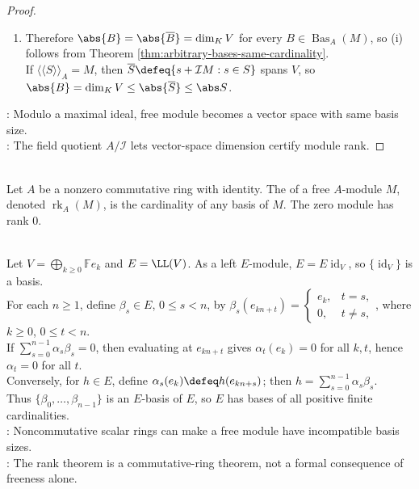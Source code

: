 \begin{theorem}
\begin{proof}
\begin{enumerate}[label=(\roman*)]
If $\overline b=\overline{b'}$ with $b\neq b'$, then $b-b'\in\mathcal{I}M$, forcing the $B$-coefficient $1\in\mathcal{I}$, impossible. Thus $B\xrightarrow{\sim}\overline B$.
\item Therefore $\abs{B}=\abs{\overline B}=\dim_K V$ for every $B\in\operatorname{Bas}_A(M)$, so (i) follows from Theorem \ref{thm:arbitrary-bases-same-cardinality}.\\
If $\langle\!\langle S\rangle\!\rangle_A=M$, then $\overline S\defeq\{s+\mathcal{I}M:s\in S\}$ spans $V$, so $\abs{B}=\dim_K V\leq\abs{\overline S}\leq\abs S$.
\end{enumerate}
: Modulo a maximal ideal, free module becomes a vector space with same basis size.\\
: The field quotient $A/\mathcal{I}$ lets vector-space dimension certify module rank.
\end{proof}
\end{theorem}

\begin{definition} \label{def:rank-of-free-module} \\
Let $A$ be a nonzero commutative ring with identity. The  of a free
$A$-module $M$, denoted $\operatorname{rk}_A(M)$, is the cardinality of any
basis of $M$. The zero module has rank $0$.
\end{definition}

\begin{example} \label{ex:noncommutative-rank-failure-endomorphism-ring} \\
Let $V=\bigoplus_{k\geq0}\mathbb{F}e_k$ and $E=\LL(V)$. As a left $E$-module, $E=E\operatorname{id}_V$, so $\{\operatorname{id}_V\}$ is a basis.\\
For each $n\geq1$, define $\beta_s\in E$, $0\leq s<n$, by $\beta_s(e_{kn+t})=
\begin{cases}
e_k,&t=s,\\
0,&t\neq s,
\end{cases}$, where $k\geq0$, $0\leq t<n$.\\
If $\sum\limits_{s=0}^{n-1}\alpha_s\beta_s=0$, then evaluating at $e_{kn+t}$ gives $\alpha_t(e_k)=0$ for all $k,t$, hence $\alpha_t=0$ for all $t$.\\
Conversely, for $h\in E$, define $\alpha_s(e_k)\defeq h(e_{kn+s})$; then $h=\sum\limits_{s=0}^{n-1}\alpha_s\beta_s$.\\
Thus $\{\beta_0,\ldots,\beta_{n-1}\}$ is an $E$-basis of $E$, so $E$ has bases of all positive finite cardinalities.\\
: Noncommutative scalar rings can make a free module have incompatible basis sizes.\\
: The rank theorem is a commutative-ring theorem, not a formal consequence of freeness alone.
\end{example}

